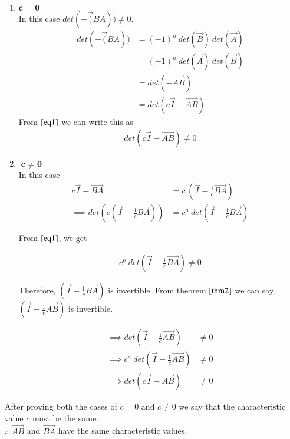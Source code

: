 \documentclass[journal,12pt,twocolumn]{IEEEtran}
\begin{document}
	\begin{enumerate}
		\item $\textbf{c = 0}$ \\
		In this case $det(- \vec(BA)) \neq 0$. 	
		\begin{align}
			det(- \vec(BA)) &= (-1)^{n} \ det(\vec{B}) \ det(\vec{A}) \nonumber\\ 
			&= (-1)^{n} \ det(\vec{A}) \ det(\vec{B}) \nonumber\\ 
			&= det(- \vec{AB}) \nonumber\\
			&= det(c\vec{I} - \vec{AB}) \nonumber
		\end{align}
		From $\eqref{eq1}$ we can write this as
		\begin{align}
			det(c\vec{I}-\vec{AB}) \neq 0
		\end{align}
		
		
		\item $\textbf{c $\neq$ 0}$ \\
		In this case 
		\begin{align}
			c\vec{I} - \vec{BA} &= c \ \left(\vec{I} - \frac{1}{c}\vec{BA}\right) \nonumber\\
			\implies det\left(c\left(\vec{I} - \frac{1}{c}\vec{BA}\right)\right) &= c^{n} \ det\left(\vec{I}-\frac{1}{c}\vec{BA}\right) \nonumber
		\end{align}	
		
		From $\eqref{eq1}$, we get
		
		\begin{align}
			c^{n} \ det\left(\vec{I}-\frac{1}{c}\vec{BA}\right) \neq 0  \nonumber
		\end{align}
		
		Therefore, $\left(\vec{I} - \frac{1}{c}\vec{BA}\right)$ is invertible. From theorem $\ref{thm2}$ we can say $\left(\vec{I} - \frac{1}{c}\vec{AB}\right)$ is invertible. 
		
		\begin{align}
			\implies det\left(\vec{I} - \frac{1}{c}\vec{AB}\right) &\neq 0 \nonumber\\
			\implies c^{n} \ det\left(\vec{I} - \frac{1}{c}\vec{AB}\right) &\neq 0 \nonumber\\
			\implies det\left(c\vec{I} - \vec{AB}\right) &\neq 0
		\end{align}
		
		
		
	\end{enumerate}
	
	After proving both the cases of $c = 0$ and $c \neq 0$ we say that the characteristic value $c$ must be the same.\\$\therefore$ $\vec{AB}$ and $\vec{BA}$ have the same characteristic values. \\
	
\end{document}
